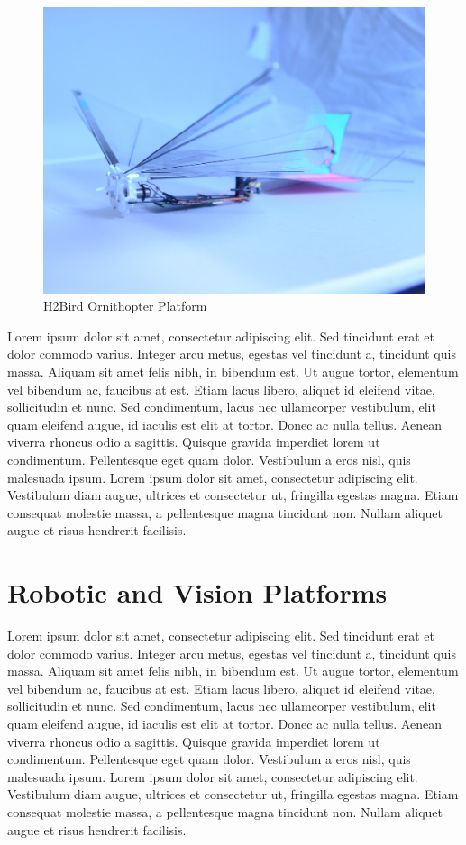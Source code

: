 \documentclass[letterpaper, 10 pt, conference]{ieeeconf}
\begin{document}
\begin{figure}[tb]
\centering
\includegraphics[width=\linewidth]{figures/h2bird.jpg}
\caption{H2Bird Ornithopter Platform}
\label{fig:H2Bird}
\end{figure}

Lorem ipsum dolor sit amet, consectetur adipiscing elit. Sed tincidunt erat et dolor commodo varius. Integer arcu metus, egestas vel tincidunt a, tincidunt quis massa. Aliquam sit amet felis nibh, in bibendum est. Ut augue tortor, elementum vel bibendum ac, faucibus at est. Etiam lacus libero, aliquet id eleifend vitae, sollicitudin et nunc. Sed condimentum, lacus nec ullamcorper vestibulum, elit quam eleifend augue, id iaculis est elit at tortor. Donec ac nulla tellus. Aenean viverra rhoncus odio a sagittis. Quisque gravida imperdiet lorem ut condimentum. Pellentesque eget quam dolor. Vestibulum a eros nisl, quis malesuada ipsum. Lorem ipsum dolor sit amet, consectetur adipiscing elit. Vestibulum diam augue, ultrices et consectetur ut, fringilla egestas magna. Etiam consequat molestie massa, a pellentesque magna tincidunt non. Nullam aliquet augue et risus hendrerit facilisis.


\section{Robotic and Vision Platforms}
Lorem ipsum dolor sit amet, consectetur adipiscing elit. Sed tincidunt erat et dolor commodo varius. Integer arcu metus, egestas vel tincidunt a, tincidunt quis massa. Aliquam sit amet felis nibh, in bibendum est. Ut augue tortor, elementum vel bibendum ac, faucibus at est. Etiam lacus libero, aliquet id eleifend vitae, sollicitudin et nunc. Sed condimentum, lacus nec ullamcorper vestibulum, elit quam eleifend augue, id iaculis est elit at tortor. Donec ac nulla tellus. Aenean viverra rhoncus odio a sagittis. Quisque gravida imperdiet lorem ut condimentum. Pellentesque eget quam dolor. Vestibulum a eros nisl, quis malesuada ipsum. Lorem ipsum dolor sit amet, consectetur adipiscing elit. Vestibulum diam augue, ultrices et consectetur ut, fringilla egestas magna. Etiam consequat molestie massa, a pellentesque magna tincidunt non. Nullam aliquet augue et risus hendrerit facilisis.
\end{document}
